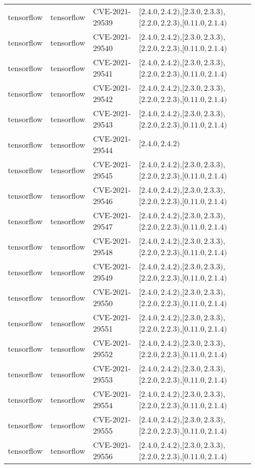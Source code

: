 \begin{tabular}{llll}
tensorflow & tensorflow & CVE-2021-29539 & $[2.4.0,2.4.2)$,$[2.3.0,2.3.3)$,$[2.2.0,2.2.3)$,$[0.11.0,2.1.4)$ \\
tensorflow & tensorflow & CVE-2021-29540 & $[2.4.0,2.4.2)$,$[2.3.0,2.3.3)$,$[2.2.0,2.2.3)$,$[0.11.0,2.1.4)$ \\
tensorflow & tensorflow & CVE-2021-29541 & $[2.4.0,2.4.2)$,$[2.3.0,2.3.3)$,$[2.2.0,2.2.3)$,$[0.11.0,2.1.4)$ \\
tensorflow & tensorflow & CVE-2021-29542 & $[2.4.0,2.4.2)$,$[2.3.0,2.3.3)$,$[2.2.0,2.2.3)$,$[0.11.0,2.1.4)$ \\
tensorflow & tensorflow & CVE-2021-29543 & $[2.4.0,2.4.2)$,$[2.3.0,2.3.3)$,$[2.2.0,2.2.3)$,$[0.11.0,2.1.4)$ \\
tensorflow & tensorflow & CVE-2021-29544 & $[2.4.0,2.4.2)$ \\
tensorflow & tensorflow & CVE-2021-29545 & $[2.4.0,2.4.2)$,$[2.3.0,2.3.3)$,$[2.2.0,2.2.3)$,$[0.11.0,2.1.4)$ \\
tensorflow & tensorflow & CVE-2021-29546 & $[2.4.0,2.4.2)$,$[2.3.0,2.3.3)$,$[2.2.0,2.2.3)$,$[0.11.0,2.1.4)$ \\
tensorflow & tensorflow & CVE-2021-29547 & $[2.4.0,2.4.2)$,$[2.3.0,2.3.3)$,$[2.2.0,2.2.3)$,$[0.11.0,2.1.4)$ \\
tensorflow & tensorflow & CVE-2021-29548 & $[2.4.0,2.4.2)$,$[2.3.0,2.3.3)$,$[2.2.0,2.2.3)$,$[0.11.0,2.1.4)$ \\
tensorflow & tensorflow & CVE-2021-29549 & $[2.4.0,2.4.2)$,$[2.3.0,2.3.3)$,$[2.2.0,2.2.3)$,$[0.11.0,2.1.4)$ \\
tensorflow & tensorflow & CVE-2021-29550 & $[2.4.0,2.4.2)$,$[2.3.0,2.3.3)$,$[2.2.0,2.2.3)$,$[0.11.0,2.1.4)$ \\
tensorflow & tensorflow & CVE-2021-29551 & $[2.4.0,2.4.2)$,$[2.3.0,2.3.3)$,$[2.2.0,2.2.3)$,$[0.11.0,2.1.4)$ \\
tensorflow & tensorflow & CVE-2021-29552 & $[2.4.0,2.4.2)$,$[2.3.0,2.3.3)$,$[2.2.0,2.2.3)$,$[0.11.0,2.1.4)$ \\
tensorflow & tensorflow & CVE-2021-29553 & $[2.4.0,2.4.2)$,$[2.3.0,2.3.3)$,$[2.2.0,2.2.3)$,$[0.11.0,2.1.4)$ \\
tensorflow & tensorflow & CVE-2021-29554 & $[2.4.0,2.4.2)$,$[2.3.0,2.3.3)$,$[2.2.0,2.2.3)$,$[0.11.0,2.1.4)$ \\
tensorflow & tensorflow & CVE-2021-29555 & $[2.4.0,2.4.2)$,$[2.3.0,2.3.3)$,$[2.2.0,2.2.3)$,$[0.11.0,2.1.4)$ \\
tensorflow & tensorflow & CVE-2021-29556 & $[2.4.0,2.4.2)$,$[2.3.0,2.3.3)$,$[2.2.0,2.2.3)$,$[0.11.0,2.1.4)$ \\

\end{tabular}
